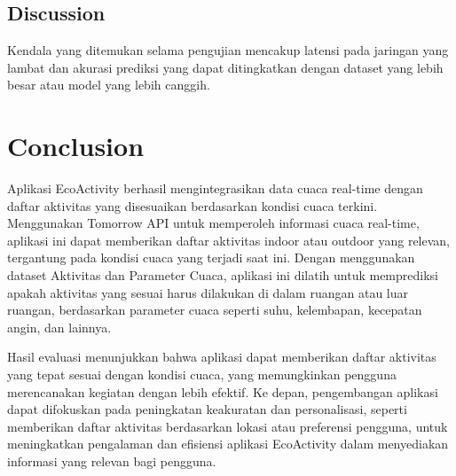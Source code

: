 \documentclass[journal,article,submit,pdftex,moreauthors]{Definitions/mdpi}
\begin{document}
\subsection{Discussion}
Kendala yang ditemukan selama pengujian mencakup latensi pada jaringan yang lambat dan akurasi prediksi yang dapat ditingkatkan dengan dataset yang lebih besar atau model yang lebih canggih.

\section{Conclusion}

Aplikasi EcoActivity berhasil mengintegrasikan data cuaca real-time dengan daftar aktivitas yang disesuaikan berdasarkan kondisi cuaca terkini. Menggunakan Tomorrow API untuk memperoleh informasi cuaca real-time, aplikasi ini dapat memberikan daftar aktivitas indoor atau outdoor yang relevan, tergantung pada kondisi cuaca yang terjadi saat ini. Dengan menggunakan dataset Aktivitas dan Parameter Cuaca, aplikasi ini dilatih untuk memprediksi apakah aktivitas yang sesuai harus dilakukan di dalam ruangan atau luar ruangan, berdasarkan parameter cuaca seperti suhu, kelembapan, kecepatan angin, dan lainnya.

Hasil evaluasi menunjukkan bahwa aplikasi dapat memberikan daftar aktivitas yang tepat sesuai dengan kondisi cuaca, yang memungkinkan pengguna merencanakan kegiatan dengan lebih efektif. Ke depan, pengembangan aplikasi dapat difokuskan pada peningkatan keakuratan dan personalisasi, seperti memberikan daftar aktivitas berdasarkan lokasi atau preferensi pengguna, untuk meningkatkan pengalaman dan efisiensi aplikasi EcoActivity dalam menyediakan informasi yang relevan bagi pengguna.
\end{document}
